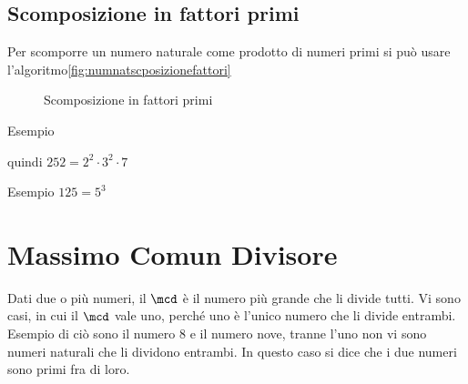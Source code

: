 \subsection{Scomposizione in fattori primi}
Per scomporre un numero naturale come prodotto di numeri primi  si può usare  l'algoritmo\nobs\vref{fig:numnatscposizionefattori}
	
\begin{figure}
\centering
{}
	\caption{Scomposizione in fattori primi}
	\label{fig:numnatscposizionefattori}
\end{figure}
	
Esempio 


quindi $252=2^2\cdot 3^2\cdot 7$

Esempio
$125=5^3$
	
\section{Massimo Comun Divisore}
\label{sec:macdNaturali}

Dati due o più numeri, il $\mcd$ è il numero più grande che li divide tutti. Vi sono casi, in cui il $\mcd$ vale uno, perché uno è l'unico numero che li divide entrambi. Esempio di ciò sono il numero 8 e il numero nove, tranne l'uno non vi sono numeri naturali che li dividono entrambi. In questo caso si dice
 che i due numeri sono primi fra di loro.
 	
